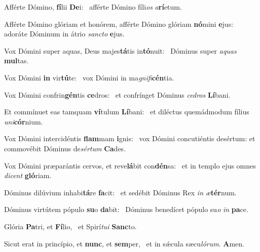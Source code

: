 \item Afférte Dómino, \textbf{fí}lii \textbf{De}i:~\psstar{} afférte Dómino fíli\textit{os} \textit{a}\textbf{rí}etum.
\item Afférte Dómino glóriam et honórem, afférte Dómino glóriam \textbf{nó}mini \textbf{e}jus:~\psstar{} adoráte Dóminum in átrio \textit{sancto} \textbf{e}jus.
\item Vox Dómini super aquas, Deus majes\textbf{tá}tis in\textbf{tó}nuit:~\psstar{} Dóminus super \textit{aquas} \textbf{mul}tas.
\item Vox Dómini \textbf{in} vir\textbf{tú}te:~\psstar{} vox Dómini in ma\textit{gnifi}\textbf{cén}tia.
\item Vox Dómini confrin\textbf{gén}tis \textbf{ce}dros:~\psstar{} et confrínget Dóminus \textit{cedros} \textbf{Lí}bani.
\item Et commínuet eas tamquam \textbf{ví}tulum \textbf{Lí}bani:~\psstar{} et diléctus quemádmodum fílius \textit{uni}\textbf{cór}nium.
\item Vox Dómini intercidéntis \textbf{flam}mam \textbf{i}gnis:~\psstar{} vox Dómini concutiéntis desértum: et commovébit Dóminus de\textit{sértum} \textbf{Ca}des.
\item Vox Dómini præparántis cervos, et reve\textbf{lá}bit con\textbf{dén}sa:~\psstar{} et in templo ejus omnes \textit{dicent} \textbf{gló}riam.
\item Dóminus dilúvium inhabi\textbf{tá}re \textbf{fa}cit:~\psstar{} et sedébit Dóminus Rex \textit{in} \textit{æ}\textbf{tér}num.
\item Dóminus virtútem pópulo \textbf{su}o \textbf{da}bit:~\psstar{} Dóminus benedícet pópulo su\textit{o} \textit{in} \textbf{pa}ce.
\item Glória \textbf{Pa}tri, et \textbf{Fí}lio,~\psstar{} et Spirí\textit{tui} \textbf{Sanc}to.
\item Sicut erat in princípio, et \textbf{nunc}, et \textbf{sem}per,~\psstar{} et in sǽcula sæcu\textit{lórum}. \textbf{A}men.